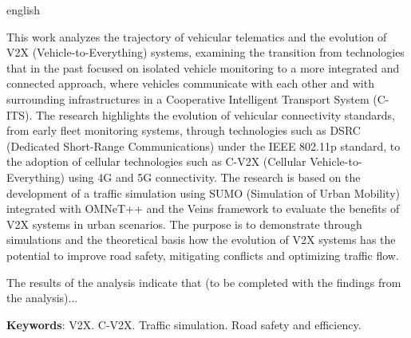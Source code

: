 \documentclass[
	12pt,				%
	openright,			%
	oneside,			%
	a4paper,			%
	english,			%
	french,				%
	spanish,			%
	brazil				%
	]{abntex2}
\begin{document}
\renewcommand{\baselinestretch}{1} 
\begin{resumo}[Abstract]
 \begin{otherlanguage*}{english}

   This work analyzes the trajectory of vehicular telematics and the evolution of V2X (Vehicle-to-Everything) systems, examining the transition from technologies
   that in the past focused on isolated vehicle monitoring to a more integrated and connected approach, where vehicles communicate with each other and with
   surrounding infrastructures in a Cooperative Intelligent Transport System (C-ITS). The research highlights the evolution of vehicular connectivity standards,
   from early fleet monitoring systems, through technologies such as DSRC (Dedicated Short-Range Communications) under the IEEE 802.11p standard, to the adoption
   of cellular technologies such as C-V2X (Cellular Vehicle-to-Everything) using 4G and 5G connectivity. The research is based on the development of a traffic
   simulation using SUMO (Simulation of Urban Mobility) integrated with OMNeT++ and the Veins framework to evaluate the benefits of V2X systems in urban
   scenarios. The purpose is to demonstrate through simulations and the theoretical basis how the evolution of V2X systems has the potential to improve road
   safety, mitigating conflicts and optimizing traffic flow.
   
   The results of the analysis indicate that (to be completed with the findings from the analysis)...

 
   \noindent 
   \textbf{Keywords}: V2X. C-V2X. Traffic simulation. Road safety and efficiency.
 \end{otherlanguage*}
\end{resumo}


\renewcommand{\listfigurename}{Lista de Figuras}
\pdfbookmark[0]{\listfigurename}{lof}
\listoffigures*
\cleardoublepage


\cleardoublepage
\end{document}
